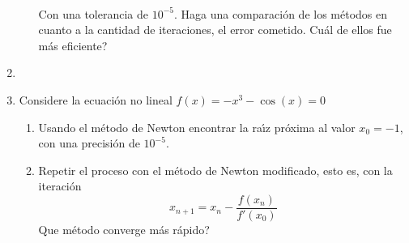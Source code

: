 \documentclass{udparticle}
\begin{document}
\begin{enumerate}
\begin{enumerate}
\\Con una tolerancia de \(10^{-5}\). Haga una comparación de los métodos en cuanto a la cantidad de iteraciones, el error cometido. Cuál de ellos fue más eficiente?

\end{enumerate}

\item %

\item Considere la ecuación no lineal $f(x) = -x^{3} - \cos(x) = 0$
    \begin{enumerate}
    
        \item Usando el método de Newton encontrar la raı́z próxima al valor $x_{0} = -1$, con una precisión de $10^{-5}$.
        
        \item Repetir el proceso con el método de Newton modificado, esto es, con la iteración $$x_{n+1} = x_{n} - \frac {f(x_{n})} {f'(x_{0})} $$
        Que método converge más rápido?
    
    \end{enumerate}

\end{enumerate}
\end{document}
